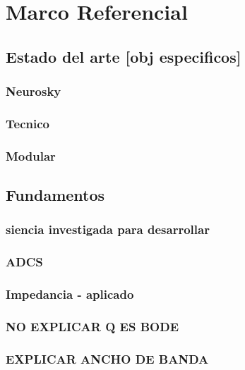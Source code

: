 \chapter{Marco Referencial}
\section{Estado del arte [obj especificos]}
\label{sec:orged209ee}
\subsection{Neurosky}
\label{sec:org2a00370}
\subsection{Tecnico}
\label{sec:org9fe16f2}
\subsection{Modular}
\label{sec:org6c62e01}
\section{Fundamentos}
\label{sec:org44538b5}
\subsection{siencia investigada para desarrollar}
\label{sec:org36158c1}
\subsection{ADCS}
\label{sec:org9d32c7d}
\subsection{Impedancia - aplicado}
\label{sec:org722e6eb}
\subsection{NO EXPLICAR Q ES BODE}
\label{sec:orga5299e9}
\subsection{EXPLICAR ANCHO DE BANDA}
\label{sec:org494f12b}
